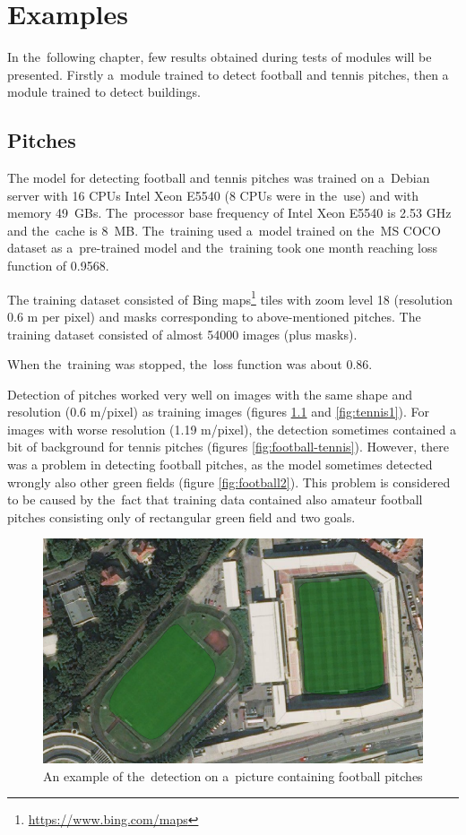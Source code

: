 \chapter{Examples}
\label{examples}

In the~following chapter, few results obtained during tests of modules will be
presented. Firstly a~module trained to detect football and tennis pitches, then 
a module trained to detect buildings.

\section{Pitches}

The model for detecting football and tennis pitches was trained on a~Debian 
server with 16 CPUs Intel Xeon E5540 (8 CPUs were in the~use) and with memory
49~GBs. The~processor base frequency of Intel Xeon E5540 is 2.53 GHz and
the~cache is 8~MB. The~training used a~model trained on the~MS COCO dataset as
a~pre-trained model and the~training took one month reaching loss function of
0.9568.

The training dataset consisted of Bing 
maps\footnote{\url{https://www.bing.com/maps}} tiles with zoom level 18 
(resolution 0.6 m per pixel) and masks corresponding to above-mentioned
pitches. The training dataset consisted of almost 54000 images (plus masks).

When the~training was stopped, the~loss function was about 0.86.

Detection of pitches worked very well on images with the same shape and
resolution (0.6 m/pixel) as training images (figures \ref{fig:football1} and
\ref{fig:tennis1}). For images with worse resolution (1.19 m/pixel), the
detection sometimes contained a bit of background for tennis pitches (figures
\ref{fig:football-tennis}). However, there
was a problem in detecting football pitches, as the model sometimes detected
wrongly also other green fields (figure \ref{fig:football2}). This problem is
considered to be caused by the~fact that training data contained also amateur
football pitches consisting only of rectangular green field and two goals.

\begin{figure}[H]
   \centering
	\includegraphics[width=.9\linewidth]{./pictures/out1.png}
	\caption[Detection of football pitches]{An example of the~detection on
	a~picture containing football pitches}
      \label{fig:football1}
\end{figure}

